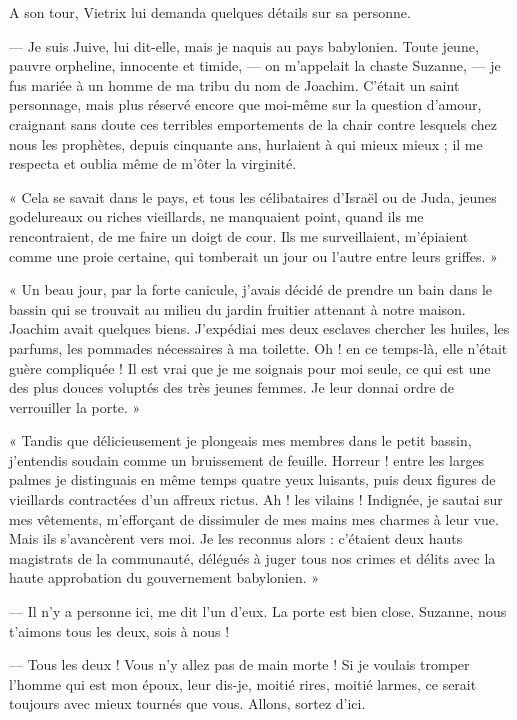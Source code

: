 \documentclass[a4paper, 11pt, oneside, polutonikogreek, french]{article}
\begin{document}
A son tour, Vietrix lui demanda quelques détails sur sa personne.

\bigskip
\centerline{\EightStarTaper}
\centerline{\EightStarTaper\EightStarTaper}
\bigskip

--- Je suis Juive, lui dit-elle, mais je naquis au pays babylonien. Toute jeune, pauvre orpheline, innocente et timide, --- on m'appelait la chaste Suzanne, --- je fus mariée à un homme de ma tribu du nom de Joachim. C'était un saint personnage, mais plus réservé encore que moi-même sur la question d'amour, craignant sans doute ces terribles emportements de la chair contre lesquels chez nous les prophètes, depuis cinquante ans, hurlaient à qui mieux mieux ; il me respecta et oublia même de m'ôter la virginité.

« Cela se savait dans le pays, et tous les célibataires d'Israël ou de Juda, jeunes godelureaux ou riches vieillards, ne manquaient point, quand ils me rencontraient, de me faire un doigt de cour. Ils me surveillaient, m'épiaient comme une proie certaine, qui tomberait un jour ou l'autre entre leurs griffes. »

« Un beau jour, par la forte canicule, j'avais décidé de prendre un bain dans le bassin qui se trouvait au milieu du jardin fruitier attenant à notre maison. Joachim avait quelques biens. J'expédiai mes deux esclaves chercher les huiles, les parfums, les pommades nécessaires à ma toilette. Oh ! en ce temps-là, elle n'était guère compliquée ! Il est vrai que je me soignais pour moi seule, ce qui est une des plus douces voluptés des très jeunes femmes. Je leur donnai ordre de verrouiller la porte. »

« Tandis que délicieusement je plongeais mes membres dans le petit bassin, j'entendis soudain comme un bruissement de feuille. Horreur ! entre les larges palmes je distinguais en même temps quatre yeux luisants, puis deux figures de vieillards contractées d'un affreux rictus. Ah ! les vilains ! Indignée, je sautai sur mes vêtements, m'efforçant de dissimuler de mes mains mes charmes à leur vue. Mais ils s'avancèrent vers moi. Je les reconnus alors : c'étaient deux hauts magistrats de la communauté, délégués à juger tous nos crimes et délits avec la haute approbation du gouvernement babylonien. »

--- Il n'y a personne ici, me dit l'un d'eux. La porte est bien close. Suzanne, nous t'aimons tous les deux, sois à nous !

--- Tous les deux ! Vous n'y allez pas de main morte ! Si je voulais tromper l'homme qui est mon époux, leur dis-je, moitié rires, moitié larmes, ce serait toujours avec mieux tournés que vous. Allons, sortez d'ici.
\end{document}
